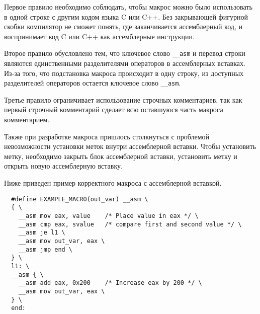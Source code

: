 Первое правило необходимо соблюдать, чтобы макрос можно было использовать в
одной строке с другим кодом языка C или C++. Без закрывающей фигурной скобки
компилятор не сможет понять, где заканчивается ассемблерный код, и воспринимает
код C или C++ как ассемблерные инструкции.

Второе правило обусловлено тем, что ключевое слово \verb!__asm! и перевод строки
являются единственными разделителями операторов в ассемблерных вставках. Из-за
того, что подстановка макроса происходит в одну строку, из доступных
разделителей операторов остается ключевое слово \verb!__asm!.

Третье правило ограничивает использование строчных комментариев, так как первый
строчный комментарий сделает всю оставшуюся часть макроса комментарием.

Также при разработке макроса пришлось столкнуться с проблемой невозможности
установки меток внутри ассемблерной вставки. Чтобы установить метку,
необходимо закрыть блок ассемблерной вставки, установить метку и открыть новую
ассемблерную вставку.

Ниже приведен пример корректного макроса с ассемблерной вставкой.
\begin{verbatim}
  #define EXAMPLE_MACRO(out_var) __asm \
  { \
    __asm mov eax, value    /* Place value in eax */ \
    __asm cmp eax, svalue   /* compare first and second value */ \
    __asm je l1 \
    __asm mov out_var, eax \ 
    __asm jmp end \
  } \
  l1: \
  __asm { \
    __asm add eax, 0x200    /* Increase eax by 200 */ \
    __asm mov out_var, eax \
  } \
  end:
\end{verbatim}
